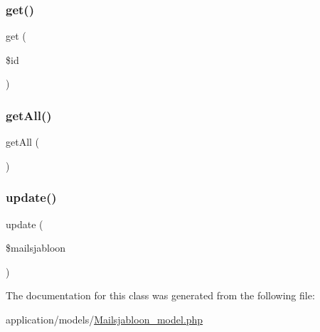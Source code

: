 \mbox{\label{class_mailsjabloon__model_a50e3bfb586b2f42932a6a93f3fbb0828}} 
\subsubsection{\texorpdfstring{get()}{get()}}
{\footnotesize\ttfamily get (\begin{DoxyParamCaption}\item[{}]{\$id }\end{DoxyParamCaption})}

\mbox{\label{class_mailsjabloon__model_aba0d5b303383fb5b1fabb5fd01cd3800}} 
\subsubsection{\texorpdfstring{get\+All()}{getAll()}}
{\footnotesize\ttfamily get\+All (\begin{DoxyParamCaption}{ }\end{DoxyParamCaption})}

\mbox{\label{class_mailsjabloon__model_ae7c31bc24182f5bed6dc1bfb9652e9ed}} 
\subsubsection{\texorpdfstring{update()}{update()}}
{\footnotesize\ttfamily update (\begin{DoxyParamCaption}\item[{}]{\$mailsjabloon }\end{DoxyParamCaption})}



The documentation for this class was generated from the following file\+:\begin{DoxyCompactItemize}
\item 
application/models/\mbox{\hyperlink{_mailsjabloon__model_8php}{Mailsjabloon\+\_\+model.\+php}}\end{DoxyCompactItemize}
